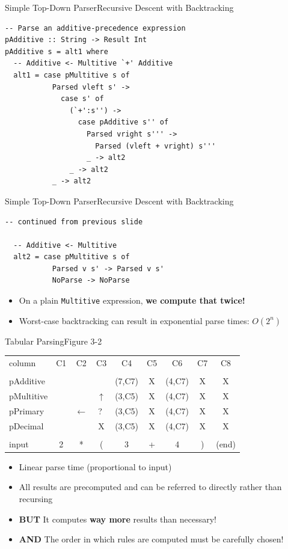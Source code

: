 \documentclass{beamer}
\begin{document}
\begin{frame}[fragile]{Simple Top-Down Parser}{Recursive Descent with
    Backtracking}
\begin{verbatim}
-- Parse an additive-precedence expression 
pAdditive :: String -> Result Int 
pAdditive s = alt1 where
  -- Additive <- Multitive `+' Additive 
  alt1 = case pMultitive s of
           Parsed vleft s' -> 
             case s' of
               (`+':s'') ->
                 case pAdditive s'' of
                   Parsed vright s''' ->
                     Parsed (vleft + vright) s'''
                   _ -> alt2
               _ -> alt2
           _ -> alt2
\end{verbatim}
\end{frame}

\begin{frame}[fragile]{Simple Top-Down Parser}{Recursive Descent with
    Backtracking}
\begin{verbatim}
-- continued from previous slide

  -- Additive <- Multitive 
  alt2 = case pMultitive s of
           Parsed v s' -> Parsed v s'
           NoParse -> NoParse
\end{verbatim}
\pause
\begin{itemize}
\item On a plain \texttt{Multitive} expression, \alert{\textbf{we compute that twice!}}
\item Worst-case backtracking can result in exponential parse times:
  $O(2^n)$
\end{itemize}
\end{frame}

\begin{frame}[fragile]{Tabular Parsing}{Figure 3-2}
\small
\begin{tabular*}{80mm}{l*{8}{c}}
  column    & C1 & C2 & C3 & C4     & C5 & C6     & C7 & C8 \\[5pt]
  \cline{2-9}\\[-8pt]
  pAdditive &    &    &    & (7,C7) & X  & (4,C7) & X  & X 
  \\[5pt]
  pMultitive &    &    & $\uparrow$   & (3,C5) & X  & (4,C7) & X  & X  \\[5pt]
   pPrimary &    & $\leftarrow$    & \textcircled{\tiny ?}   & (3,C5) & X  & (4,C7) & X  & X  \\[5pt]
   pDecimal &    &   & X  & (3,C5) & X  & (4,C7) & X  & X  \\[5pt]
  \cline{2-9}\\[-8pt]
   input & 2  & *  & (  & 3      & +  & 4      & )  & (end)
\end{tabular*}
\pause
\bigskip
\begin{itemize}
\item Linear parse time (proportional to input)
\item All results are precomputed and can be referred to directly
  rather than recursing
\pause
\item \textbf{BUT} It computes \textbf{way more} results than
  necessary!
\item \textbf{AND} The order in which rules are computed must be
  carefully chosen!
\end{itemize}
\end{frame}
\end{document}

